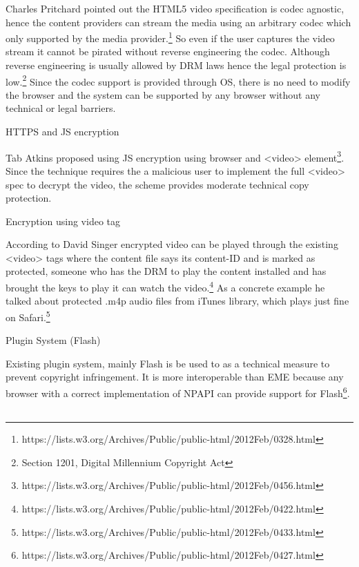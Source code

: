 Charles Pritchard pointed out the HTML5 video specification is codec
agnostic, hence the content providers can stream the media using an
arbitrary codec which only supported by the media provider.\footnote{https://lists.w3.org/Archives/Public/public-html/2012Feb/0328.html}
So even if the user captures the video stream it cannot be pirated
without reverse engineering the codec. Although reverse engineering is
usually allowed by DRM laws hence the legal protection is low.\footnote{Section
  1201, Digital Millennium Copyright Act} Since the codec support is
provided through OS, there is no need to modify the browser and the
system can be supported by any browser without any technical or legal
barriers.

\protect\hypertarget{anchor-13}{}{}HTTPS and JS encryption

Tab Atkins proposed using JS encryption using browser and
\textless{}video\textgreater{} element\footnote{https://lists.w3.org/Archives/Public/public-html/2012Feb/0456.html}.
Since the technique requires the a malicious user to implement the full
\textless{}video\textgreater{} spec to decrypt the video, the scheme
provides moderate technical copy protection.

\protect\hypertarget{anchor-14}{}{}Encryption using video tag

According to David Singer encrypted video can be played through the
existing \textless{}video\textgreater{} tags where the content file says
its content-ID and is marked as protected, someone who has the DRM to
play the content installed and has brought the keys to play it can watch
the video.\footnote{https://lists.w3.org/Archives/Public/public-html/2012Feb/0422.html}
As a concrete example he talked about protected .m4p audio files from
iTunes library, which plays just fine on Safari.\footnote{https://lists.w3.org/Archives/Public/public-html/2012Feb/0433.html}

\protect\hypertarget{anchor-15}{}{}Plugin System (Flash)

Existing plugin system, mainly Flash is be used to as a technical
measure to prevent copyright infringement. It is more interoperable than
EME because any browser with a correct implementation of NPAPI can
provide support for Flash\footnote{https://lists.w3.org/Archives/Public/public-html/2012Feb/0427.html}.

\begin{longtable}[]{@{}@{}}
\toprule
\tabularnewline
\tabularnewline
\tabularnewline
\tabularnewline
\tabularnewline
\tabularnewline
\bottomrule
\end{longtable}

